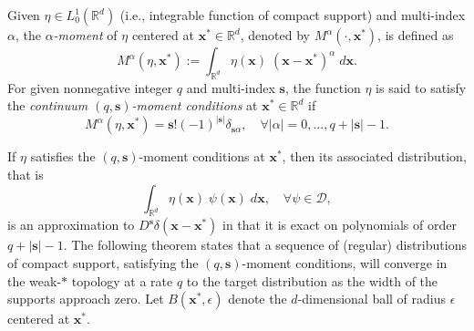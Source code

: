 %
Given $\eta\in L^1_0(\mathbb R^d)$ (i.e., integrable function of compact support) and multi-index $\alpha$, the {\em $\alpha$-moment} of $\eta$ centered at $\mathbf x^*\in\mathbb R^d$, denoted by $M^\alpha(\cdot,\mathbf x^*)$, is defined as
\begin{equation}\label{eq:def_mom}
	M^\alpha(\eta,\mathbf x^*) := \int_{\mathbb R^d} \eta(\mathbf x) \; (\mathbf x-\mathbf x^*)^{\alpha} \; d\mathbf x.
\end{equation}
For given nonnegative integer $q$ and multi-index $\mathbf s$, the function $\eta$ is said to satisfy the {\em continuum $(q,\mathbf s)$-moment conditions} at $\mathbf x^*\in \mathbb R^d$ if
\begin{equation}\label{eq:momcond}
	M^\alpha(\eta,\mathbf x^*) = \mathbf s! (-1)^{|\mathbf s|} \delta_{\mathbf s \alpha}, \quad \forall |\alpha|=0,...,q+|\mathbf s|-1.
\end{equation}

If $\eta$ satisfies the $(q,\mathbf s)$-moment conditions at $\mathbf x^*$, then its associated distribution, that is
\[
	\int_{\mathbb R^d} \eta(\mathbf x) \; \psi(\mathbf x)\; d\mathbf x, \quad \forall \psi\in\mathcal D,
\]	
is an approximation to $D^{\mathbf s}\delta(\mathbf x-\mathbf x^*)$ in that it is exact on polynomials of order $q+|\mathbf s|-1$.
The following theorem states that a sequence of (regular) distributions of compact support, satisfying the $(q,\mathbf s)$-moment conditions, will converge in the weak-$*$ topology at a rate $q$ to the target distribution as the width of the supports approach zero. 
Let $B(\mathbf x^*,\epsilon)$ denote the $d$-dimensional ball of radius $\epsilon$ centered at $\mathbf x^*$.

